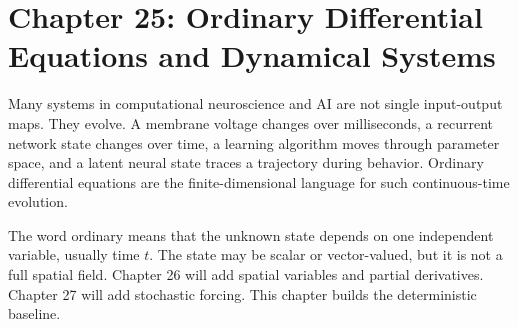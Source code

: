 \section{Chapter 25: Ordinary Differential Equations and Dynamical Systems}
\label{ch:ordinary-differential-equations-dynamical-systems}

Many systems in computational neuroscience and AI are not single input-output maps. They evolve. A membrane voltage changes over milliseconds, a recurrent network state changes over time, a learning algorithm moves through parameter space, and a latent neural state traces a trajectory during behavior. Ordinary differential equations are the finite-dimensional language for such continuous-time evolution.

The word ordinary means that the unknown state depends on one independent variable, usually time \(t\). The state may be scalar or vector-valued, but it is not a full spatial field. Chapter 26 will add spatial variables and partial derivatives. Chapter 27 will add stochastic forcing. This chapter builds the deterministic baseline.

